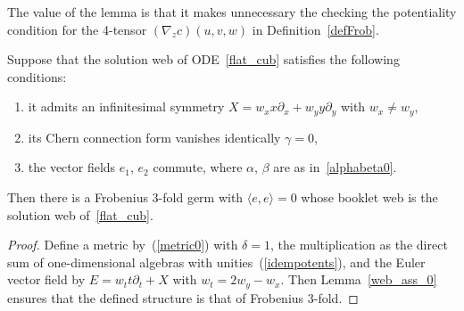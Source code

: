 \documentclass[pdftex]{sigma}
\begin{document}
The value of the lemma is that it makes unnecessary the checking the potentiality condition for the 4-tensor $(\nabla_z c)(u,v,w)$ in Def\/inition~\ref{defFrob}.
\begin{theorem}\label{web_Frobenius_0}
Suppose that the solution web of ODE~\eqref{flat_cub} satisfies the following conditions:
\begin{enumerate}\itemsep=0pt
\item[$1)$] it admits an infinitesimal symmetry $X=w_xx\partial_x+w_yy\partial_y$ with $w_x\ne w_y$,
\item[$2)$] its Chern connection form vanishes identically $\gamma=0$,
\item[$3)$] the vector fields $e_1$, $e_2$ commute, where $\alpha$, $\beta$ are as in~\eqref{alphabeta0}.
\end{enumerate}
Then there is a Frobenius $3$-fold germ with $\langle e,e\rangle=0$
whose booklet web is the solution web of~\eqref{flat_cub}.
\end{theorem}
\begin{proof}
Def\/ine a metric by~(\ref{metric0}) with $\delta=1$,
the multiplication as the direct sum of one-dimensional algebras with unities~(\ref{idempotents}),
and the Euler vector f\/ield by $E=w_tt\partial_t+X$ with $w_t=2w_y-w_x$.
Then Lemma~\ref{web_ass_0} ensures that the def\/ined structure is that of Frobenius \mbox{$3$-fold}.
\end{proof}
\end{document}
